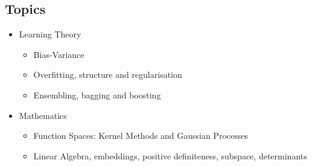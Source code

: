 
\begin{slide}
\section{Topics}

\begin{PauseHighLight}
  \begin{itemize}
  \item Learning Theory
    \begin{itemize}\squeeze
    \item Bias-Variance\pause
    \item Overfitting, structure and regularisation\pause
    \item Ensembling, bagging and boosting\pause
    \end{itemize}
  \item Mathematics
    \begin{itemize}\squeeze
    \item Function Spaces: Kernel Methods and Gaussian Processes\pause
    \item Linear Algebra, embeddings, positive definiteness, subspace,
      determinants\pause
    \end{itemize}
  \end{itemize}
\end{PauseHighLight}

\end{slide}


